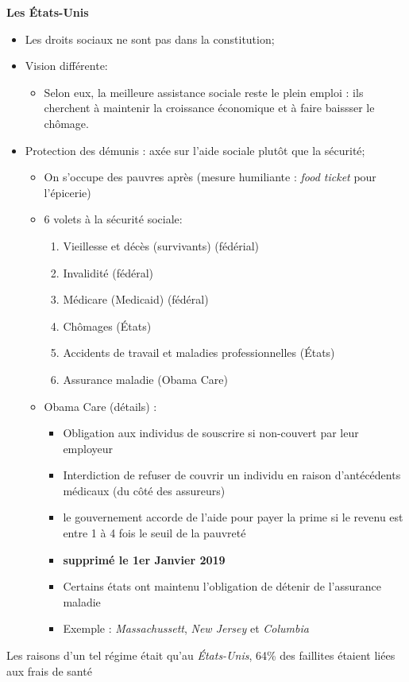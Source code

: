 \documentclass[10pt, french]{article}
\begin{document}
\begin{multicols*}{3}
\textbf{Les États-Unis}

\begin{itemize}[leftmargin = *]
	\item	Les droits sociaux ne sont pas dans la constitution;
	\item Vision différente:
	  \begin{itemize}
	  \item Selon eux, la meilleure assistance sociale reste le plein emploi : ils cherchent à maintenir la croissance économique et à faire baissser le chômage.
	  \end{itemize}
	\item Protection des démunis : axée sur l'aide sociale plutôt que la sécurité;
	  \begin{itemize}
	  \item On s'occupe des pauvres après (mesure humiliante : \textit{food ticket} pour l'épicerie)
	  \item 6 volets à la sécurité sociale:
	  \begin{enumerate}
	    \item Vieillesse et décès (survivants) (fédérial)
	    \item Invalidité (fédéral)
	    \item Médicare (Medicaid) (fédéral)
	    \item Chômages (États)
	    \item Accidents de travail et maladies professionnelles (États)
	    \item Assurance maladie (Obama Care)
	  \end{enumerate}
	\item Obama Care (détails) : 
	  \begin{itemize}
	    \item Obligation aux individus de souscrire si non-couvert par leur employeur
	    \item Interdiction de refuser de couvrir un individu en raison d'antécédents médicaux (du côté des assureurs)
	    \item le gouvernement accorde de l'aide pour payer la prime si le revenu est entre 1 à 4 fois le seuil de la pauvreté
	    \item \textbf{supprimé le 1er Janvier 2019 }
	    \item Certains états ont maintenu l'obligation de détenir de l'assurance maladie
	    \item[] Exemple : \textit{Massachussett}, \textit{New Jersey} et \textit{Columbia}
	 \end{itemize}
	 \end{itemize}
	 \end{itemize}
 Les raisons d'un tel régime était qu'au \textit{États-Unis}, 64\% des faillites étaient liées aux frais de santé
\newpage


\end{multicols*}
\end{document}
